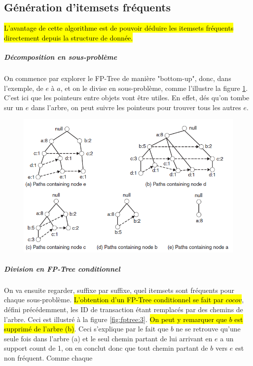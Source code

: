 \documentclass[letterpaper, 12pt]{article}
\newcommand{\alinea}{
\hspace*{0.5cm}}
\begin{document}
		\subsection{Génération d'itemsets fréquents}
			\alinea\hl{ L'avantage de cette algorithme est de pouvoir déduire
				les itemsets fréquents directement depuis la structure
				de donnée.}
			\subparagraph{Décomposition en sous-problème} On commence
				par explorer le FP-Tree de manière "bottom-up",
				donc, dans l'exemple, de $e$ à $a$, et on le divise 
				en sous-problème, comme l'illustre la figure 
				\ref{fig:fptree:2}. C'est ici que les pointeurs entre
				objets vont être utiles. En effet, dés qu'on tombe
				sur un $e$ dans l'arbre, on peut suivre les pointeurs
				pour trouver tous les autres $e$.
			\begin{figure}[H]
				\centering
				\includegraphics[scale=0.6]{Images/fptree_2.png}
				\caption{}
				\label{fig:fptree:2}
			\end{figure}\noindent
			\vspace*{-1cm}
			\subparagraph{Division en FP-Tree conditionnel} On va ensuite
				regarder, suffixe par suffixe, quel itemsets sont fréquents
				pour chaque sous-problème.\hl{ L'obtention d'un FP-Tree 
				conditionnel se fait par $cocov$}, défini précédemment, 
				les ID de transaction étant remplacés par des chemins 
				de l'arbre. Ceci est illustré à la figure 
				\ref{fig:fptree:3}. \hl{On peut y remarquer que $b$ est
				supprimé de l'arbre (b)}. Ceci s'explique par le fait
				que $b$ ne se retrouve qu'une seule fois dans l'arbre (a)
				et le seul chemin partant de lui arrivant en $e$ a un 
				support count de 1, on en conclut donc que tout chemin 
				partant de $b$ vers $e$ est non fréquent. Comme chaque 
\end{document}
